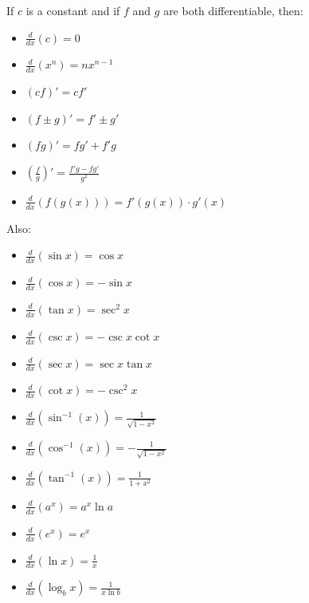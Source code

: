 \documentclass[12pt]{article}
\begin{document}
	{
		If $c$ is a constant and if $f$ and $g$ are both differentiable, then:
		\begin{multicols}{2}
		\begin{itemize}[leftmargin=0.375in,itemsep=0.0625in,label=$\circ$]
			\item $\displaystyle\frac{d}{dx}(c)=0$
			\item $\displaystyle\frac{d}{dx}\left(x^n\right)=nx^{n-1}$
			\item $(cf)'=cf'$
			\item $(f\pm g)'=f'\pm g'$
			\item $(fg)'=fg'+f'g$
			\item $\displaystyle\left(\frac{f}{g}\right)'=\frac{f'g-fg'}{g^2}$
			\item $\displaystyle\frac{d}{dx}\left(f(g(x))\right)=f'(g(x))\cdot g'(x)$
		\end{itemize}
		\end{multicols}
	
		\noindent Also:
		\begin{multicols}{3}
			\begin{itemize}[leftmargin=0.375in,itemsep=0.0625in,label=$\circ$]
				\item $\displaystyle\frac{d}{dx}(\sin{x})=\cos{x}$
				\item $\displaystyle\frac{d}{dx}(\cos{x})=-\sin{x}$
				\item $\displaystyle\frac{d}{dx}(\tan{x})=\sec^2{x}$
				\item $\displaystyle\frac{d}{dx}(\csc{x})=-\csc{x}\cot{x}$
				\item $\displaystyle\frac{d}{dx}(\sec{x})=\sec{x}\tan{x}$
				\item $\displaystyle\frac{d}{dx}(\cot{x})=-\csc^2{x}$
				\item $\displaystyle\frac{d}{dx}(\sin^{-1}(x))=\frac{1}{\sqrt{1-x^2}}$
				\item $\displaystyle\frac{d}{dx}(\cos^{-1}(x))=-\frac{1}{\sqrt{1-x^2}}$
				\item $\displaystyle\frac{d}{dx}(\tan^{-1}(x))=\frac{1}{1+x^2}$
				\columnbreak
				\item $\displaystyle\frac{d}{dx}(a^x)=a^x\ln{a}$
				\item $\displaystyle\frac{d}{dx}(e^x)=e^x$ 
				\item $\displaystyle\frac{d}{dx}(\ln{x})=\frac{1}{x}$
				\item $\displaystyle\frac{d}{dx}(\log_b{x})=\frac{1}{x\ln{b}}$
			\end{itemize}
		\end{multicols}
	}
\end{document}
